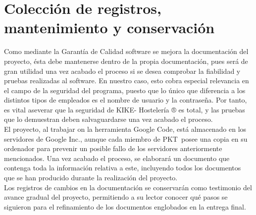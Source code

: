 \documentclass[spanish,a4paper,11pt, twoside]{report}	%
\newcommand*{\PKT}{\hbox{P}\kern-2.5pt\lower3.5pt\hbox{\small{K}}\kern-2.8pt\hbox{T}\kern-2pt}	%
\begin{document}

\newpage
\mbox{}
\thispagestyle{empty}						%
\newpage

\chapter{ Colección de registros, mantenimiento y conservación}

	Como mediante la Garantía de Calidad software se mejora la documentación del proyecto, ésta debe mantenerse dentro de la propia documentación, pues será de gran utilidad una vez acabado el proceso si se desea comprobar la fiabilidad y pruebas realizadas al software. En nuestro caso, esto cobra especial relevancia en el campo de la seguridad del programa, puesto que lo único que diferencia a los distintos tipos de empleados es el nombre de usuario y la contraseña. Por tanto, es vital aseverar que la seguridad de KIKE- Hostelería ® es total, y las pruebas que lo demuestran deben salvaguardarse una vez acabado el proceso.\\

El proyecto, al trabajar on la herramienta Google Code, está almacenado en los servidores de Google Inc., aunque cada miembro de \PKT \ posee una copia en su ordenador para prevenir un posible fallo de los servidores anteriormente mencionados. Una vez acabado el proceso, se elaborará un documento que contenga toda la información relativa a este, incluyendo todos los documentos que se han producido durante la realización del proyecto. \\

Los registros de cambios en la documentación se conservarán como testimonio del avance gradual del proyecto, permitiendo a su lector conocer qué pasos se siguieron para el refinamiento de los documentos englobados en la entrega final.


\newpage
\mbox{}
\thispagestyle{empty}						%
\newpage
\end{document}
